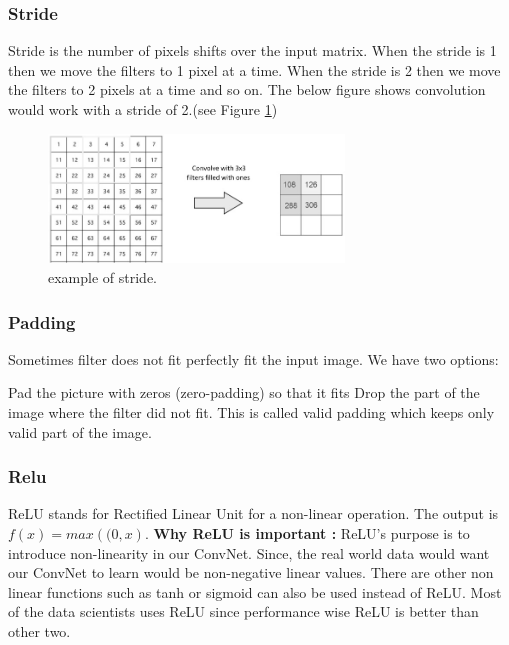 \subsubsection{Stride}
Stride is the number of pixels shifts over the input matrix. When the stride is 1 then we move the filters to 1 pixel at a time. When the stride is 2 then we move the filters to 2 pixels at a time and so on. The below figure shows convolution would work with a stride of 2.(see Figure \ref{stride})
\begin{figure}[H]
	\centering
	\includegraphics[width=0.7\textwidth]{stride.jpg}
	\caption{example of stride.}
	\label{stride}
\end{figure}
\subsubsection{Padding}
Sometimes filter does not fit perfectly fit the input image. We have two options:

Pad the picture with zeros (zero-padding) so that it fits Drop the part of the image where the filter did not fit. This is called valid padding which keeps only valid part of the image.
\subsubsection{Relu}
ReLU stands for Rectified Linear Unit for a non-linear operation. The output is $f\left(x\right) = max\left( (0,x\right)$.
\newline
\textbf{Why ReLU is important :} ReLU’s purpose is to introduce non-linearity in our ConvNet. Since, the real world data would want our ConvNet to learn would be non-negative linear values.
\newline
There are other non linear functions such as tanh or sigmoid can also be used instead of ReLU. Most of the data scientists uses ReLU since performance wise ReLU is better than other two.
